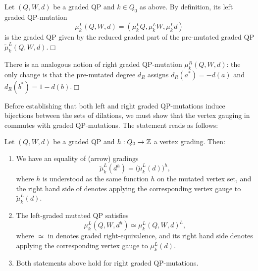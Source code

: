 \begin{definition}
Let $(Q,W,d)$ be a graded QP and $k\in Q_0$ as above. By definition, its left graded QP-mutation
$$\mu_k^L(Q,W,d)=(\mu_k^LQ,\mu_k^LW,\mu_k^Ld)$$
is the graded QP given by the reduced graded part of the pre-mutated graded QP $\tilde{\mu}_k^L(Q,W,d)$.\hfill$\Box$
\end{definition}

\begin{remark}
There is an analogous notion of right graded QP-mutation $\mu_k^R(Q,W,d)$: the only change is that the pre-mutated degree $d_R$ assigns $d_R(a^*)=-d(a)$ and $d_R(b^*)=1-d(b)$.\hfill$\Box$
\end{remark}

Before establishing that both left and right graded QP-mutations induce bijections between the sets of dilations, we must show that the vertex gauging in  commutes with graded QP-mutations. The statement reads as follows:

\begin{lemma}\label{prop:gauge-mutation}
Let $(Q,W,d)$ be a graded QP and \(h:Q_0\to\mathbb Z\) a vertex grading. Then:

\begin{enumerate}
    \item We have an equality of (arrow) gradings
    \begin{equation}\label{eq:gauge-premutation}
 \widetilde\mu_k^L(d^h)
 =\bigl(\widetilde\mu_k^L(d)\bigr)^h,
\end{equation}
where $h$ is understood as the same function \(h\) on the mutated vertex set, and the right hand side of  denotes applying the corresponding vertex gauge to $\widetilde\mu_k^L(d)$.\\

 \item The left-graded mutated QP satisfies
 \begin{equation}\label{eq:gauge-reduced-mutation}
 \mu_k^L(Q,W,d^h)
 \simeq
 \mu_k^L(Q,W,d)^h,
\end{equation}
where $\simeq$ in  denotes graded right-equivalence, and its right hand side denotes applying the corresponding vertex gauge to $\mu_k^L(d)$.\\

\item Both statements above hold for right graded QP-mutations.

\end{enumerate}
\end{lemma}

